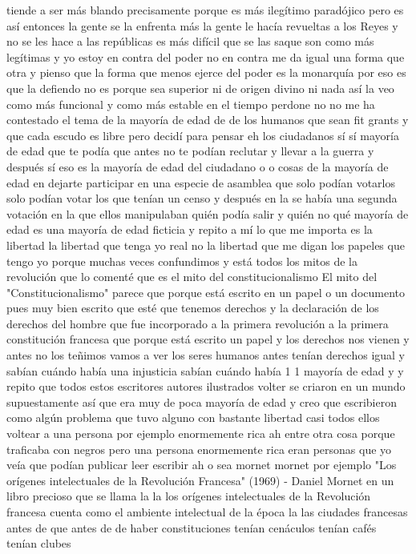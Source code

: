 tiende a ser más blando precisamente porque es más ilegítimo paradójico pero es así entonces
la gente se la enfrenta más la gente le hacía revueltas a los Reyes y no se les hace a las repúblicas es más difícil que se las saque
son como más legítimas y yo estoy en contra del poder no en contra me da igual una forma que otra y pienso que la forma
que menos ejerce del poder es la monarquía por eso es que la defiendo no es porque sea superior ni de origen divino ni nada así
la veo como más funcional y como más estable en el tiempo
perdone no no me ha contestado el tema de la mayoría de edad de de los humanos que sean fit grants y que cada escudo es libre
pero decidí para pensar eh los ciudadanos sí sí mayoría de edad que te podía
que antes no te podían reclutar y llevar a la guerra y después sí eso es la mayoría de edad del ciudadano o o cosas de la mayoría de edad
en dejarte participar en una especie de asamblea que solo podían votarlos solo podían votar los que tenían un censo
y después en la se había una segunda votación en la que ellos manipulaban quién podía salir y quién no qué mayoría de edad
es una mayoría de edad ficticia y repito a mí lo que me importa es la libertad la libertad que tenga yo real no la libertad que me digan los papeles que tengo yo
porque muchas veces confundimos y está todos los mitos de la revolución que lo comenté que es el mito del constitucionalismo
El mito del "Constitucionalismo"
parece que porque está escrito en un papel o un documento pues muy bien escrito que esté que tenemos derechos y
la declaración de los derechos del hombre que fue incorporado a la primera revolución a la primera constitución francesa que porque está escrito un papel
y los derechos nos vienen y antes no los teñimos vamos a ver los seres humanos antes tenían derechos igual y sabían cuándo había una injusticia
sabían cuándo había 1 1 mayoría de edad y y repito que todos estos escritores autores ilustrados
volter se criaron en un mundo supuestamente así que era muy de poca mayoría de edad y creo que escribieron
como algún problema que tuvo alguno con bastante libertad casi todos ellos voltear a una persona por ejemplo enormemente rica
ah entre otra cosa porque traficaba con negros pero una persona enormemente rica
eran personas que yo veía que podían publicar leer escribir ah o sea mornet mornet por ejemplo
"Los orígenes intelectuales de la Revolución Francesa" (1969) - Daniel Mornet
en un libro precioso que se llama la la los orígenes intelectuales de la Revolución francesa cuenta como el ambiente intelectual de la época
la las ciudades francesas antes de que antes de de haber constituciones tenían cenáculos tenían cafés tenían clubes
